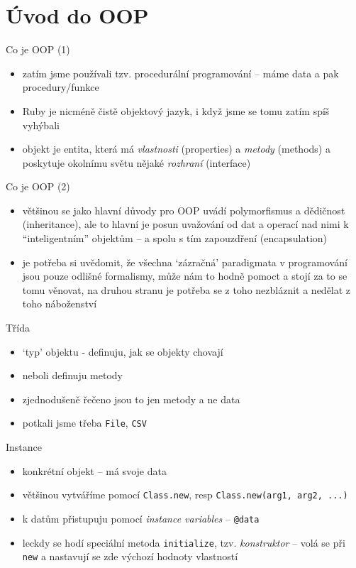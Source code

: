 \documentclass{beamer}
\begin{document}
\section{Úvod do OOP}

\begin{frame}{Co je OOP (1)}
  \begin{itemize}
    \item zatím jsme používali tzv. procedurální programování – máme data a pak procedury/funkce
    \item Ruby je nicméně čistě objektový jazyk, i když jsme se tomu zatím spíš vyhýbali
    \item objekt je entita, která má \emph{vlastnosti} (properties) a \emph{metody} (methods) a poskytuje okolnímu světu nějaké \emph{rozhraní} (interface)
  \end{itemize}
\end{frame}

\begin{frame}{Co je OOP (2)}
  \begin{itemize}
    \item většinou se jako hlavní důvody pro OOP uvádí polymorfismus a dědičnost (inheritance), ale to hlavní je posun uvažování od dat a operací nad nimi k ``inteligentním'' objektům – a spolu s tím zapouzdření (encapsulation)
    \item je potřeba si uvědomit, že všechna `zázračná' paradigmata v programování jsou pouze odlišné formalismy, může nám to hodně pomoct a stojí za to se tomu věnovat, na druhou stranu je potřeba se z toho nezbláznit a nedělat z toho náboženství
  \end{itemize}
\end{frame}

\begin{frame}{Třída}
  \begin{itemize}
    \item `typ' objektu - definuju, jak se objekty chovají
    \item neboli definuju metody
    \item zjednodušeně řečeno jsou to jen metody a ne data
    \item potkali jsme třeba \texttt{File}, \texttt{CSV}
  \end{itemize}
\end{frame}

\begin{frame}[containsverbatim]{Instance}
  \begin{itemize}
    \item konkrétní objekt – má svoje data
    \item většinou vytváříme pomocí \texttt{Class.new}, resp \texttt{Class.new(arg1, arg2, ...)}
    \item k datům přistupuju pomocí \emph{instance variables} -- \verb|@data|
    \item leckdy se hodí speciální metoda \texttt{initialize}, tzv. \emph{konstruktor} -- volá se při \texttt{new} a nastavují se zde výchozí hodnoty vlastností
  \end{itemize}
\end{frame}
\end{document}
